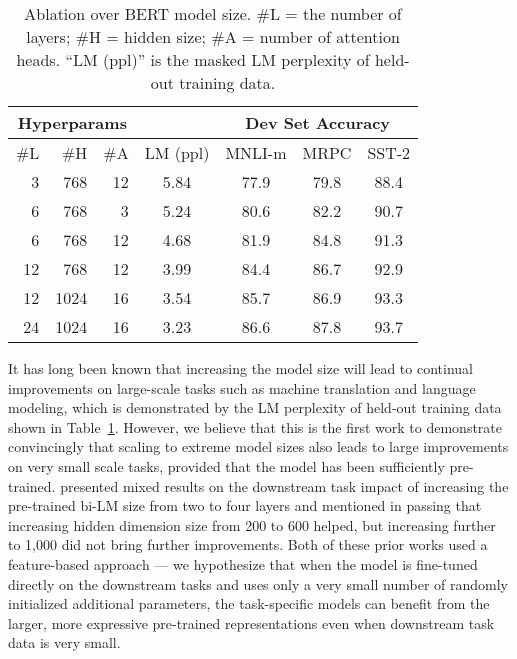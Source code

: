\documentclass[11pt,a4paper]{article}
\begin{document}
\begin{table}[b]
\begin{center}
{\small
\begin{tabular}{@{}rrrcccc@{}}
  \toprule
  \multicolumn{3}{c}{Hyperparams}      &      & \multicolumn{3}{c}{Dev Set Accuracy} \\
  \midrule
  \#L & \#H &\#A & LM (ppl) & MNLI-m & MRPC &SST-2               \\
  \midrule
  \
   3 &  768 & 12 & 5.84 & 77.9 & 79.8 & 88.4 \\
   6 &  768 &  3 & 5.24 & 80.6 & 82.2 & 90.7 \\
   6 &  768 & 12 & 4.68 & 81.9 & 84.8 & 91.3 \\
  12 &  768 & 12 & 3.99 & 84.4 & 86.7 & 92.9 \\
  12 & 1024 & 16 & 3.54 & 85.7 & 86.9 & 93.3 \\
  24 & 1024 & 16 & 3.23 & 86.6 & 87.8 & 93.7 \\
\bottomrule
\end{tabular}
} \end{center}
\caption{\label{tab:size_ablation} Ablation over BERT model size. \#L = the number of layers; \#H = hidden size; \#A = number of attention heads. ``LM (ppl)'' is the masked LM perplexity of held-out training data.}
\end{table}
 
It has long been known that increasing the model size will lead to continual improvements on large-scale tasks such as machine translation and language modeling, which is demonstrated by the LM perplexity of held-out training data shown in Table~\ref{tab:size_ablation}. However, we believe that this is the first work to demonstrate convincingly that scaling to extreme model sizes also leads to large improvements on very small scale tasks, provided that the model has been sufficiently pre-trained. \citet{peters2018dissecting} presented mixed results on the downstream task impact of increasing the pre-trained bi-LM size from two to four layers and \citet{melamud2016context2vec} mentioned in passing that increasing hidden dimension size from 200 to 600 helped, but increasing further to 1,000 did not bring further improvements. Both of these prior works used a feature-based approach --- we hypothesize that when the model is fine-tuned directly on the downstream tasks and uses only a very small number of randomly initialized additional parameters, the task-specific models can benefit from the larger, more expressive pre-trained representations even when downstream task data is very small. 
\end{document}
